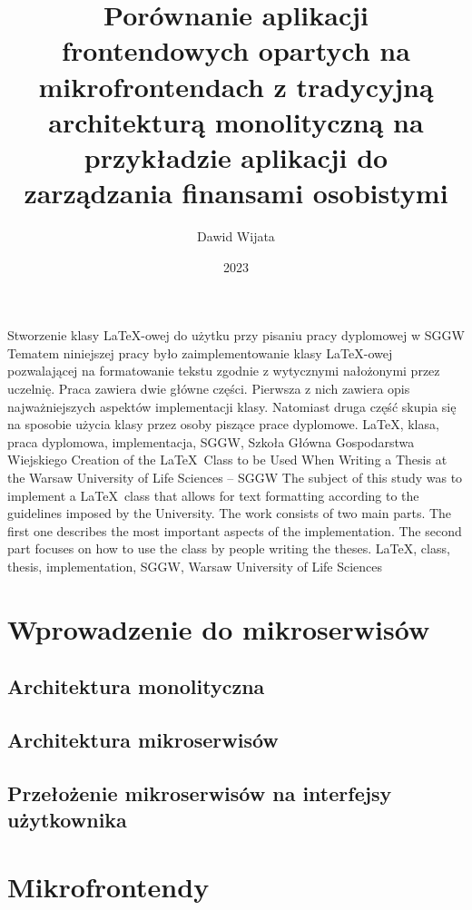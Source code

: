 \documentclass{SGGW-thesis}
\title{Porównanie aplikacji frontendowych opartych na mikrofrontendach z tradycyjną architekturą monolityczną na przykładzie aplikacji do zarządzania finansami osobistymi}
\author{Dawid Wijata}
\date{2023}
\begin{document}
\maketitle
\statementpage
\abstractpage
{Stworzenie klasy \LaTeX-owej do użytku przy pisaniu pracy dyplomowej w SGGW}
{Tematem niniejszej pracy było zaimplementowanie klasy \LaTeX-owej pozwalającej na formatowanie tekstu zgodnie z wytycznymi nałożonymi przez uczelnię. Praca zawiera dwie
główne części. Pierwsza z nich zawiera opis najważniejszych aspektów implementacji klasy. Natomiast druga część skupia się na sposobie użycia klasy przez osoby piszące prace
dyplomowe.}
{LaTeX, klasa, praca dyplomowa, implementacja, SGGW, Szkoła Główna Gospodarstwa Wiejskiego}
{Creation of the \LaTeX\ Class to be Used When Writing a Thesis at the Warsaw University of Life Sciences -- SGGW}
{The subject of this study was to implement a \LaTeX\ class that allows for text formatting according to the guidelines imposed by the University. The work consists of two
main parts. The first one describes the most important aspects of the implementation. The second part focuses on how to use the class by people writing the theses.}
{LaTeX, class, thesis, implementation, SGGW, Warsaw University of Life Sciences}


{
  \doublespacing
  \tableofcontents
}

\startchapterfromoddpage %

\chapter{Wprowadzenie do mikroserwisów}
  \section{Architektura monolityczna}
  \section{Architektura mikroserwisów}
  \section{Przełożenie mikroserwisów na interfejsy użytkownika}

\chapter{Mikrofrontendy}
\end{document}
